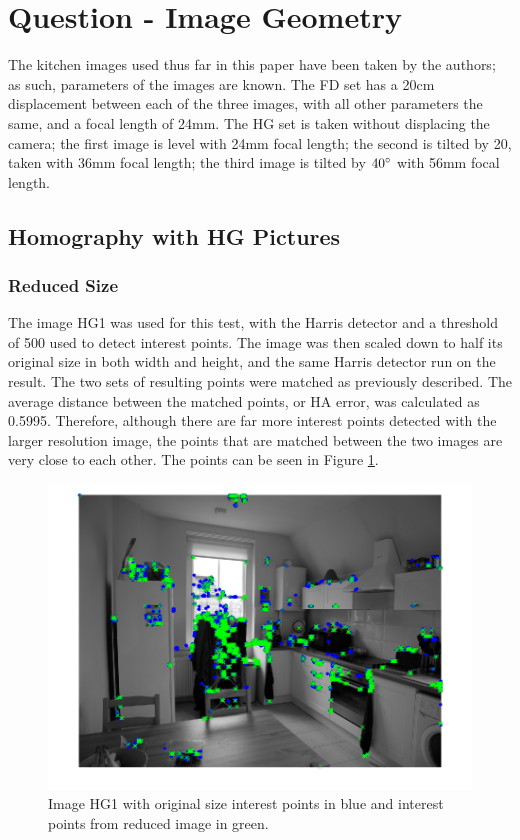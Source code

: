 \documentclass[a4paper, 10pt, conference]{ieeeconf}
\begin{document}
\section{Question - Image Geometry}

The kitchen images used thus far in this paper have been taken by the authors; as such, parameters of the images are known. The FD set has a 20cm displacement between each of the three images, with all other parameters the same, and a focal length of 24mm. The HG set is taken without displacing the camera; the first image is level with 24mm focal length; the second is tilted by 20\degree, taken with 36mm focal length; the third image is tilted by $40\degree$ with 56mm focal length.

\subsection{Homography with HG Pictures}

\subsubsection{Reduced Size}
The image HG1 was used for this test, with the Harris detector and a threshold of 500 used to detect interest points. The image was then scaled down to half its original size in both width and height, and the same Harris detector run on the result. The two sets of resulting points were matched as previously described. The average distance between the matched points, or HA error, was calculated as 0.5995. Therefore, although there are far more interest points detected with the larger resolution image, the points that are matched between the two images are very close to each other. The points can be seen in Figure \ref{fig:reducedcompare}.

\begin{figure}[!ht]
  \centering
  \includegraphics[width=\linewidth]{pic/q2_1_a_imgBoth}
  \caption{Image HG1 with original size interest points in blue and interest points from reduced image in green.}
  \label{fig:reducedcompare}
\end{figure}
\end{document}
